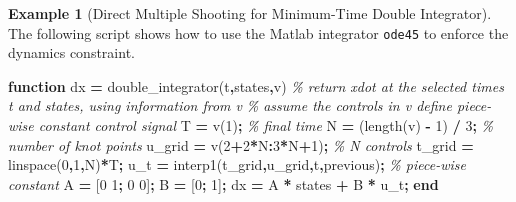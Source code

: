 \documentclass[
]{book}
\newenvironment{Shaded}{\begin{snugshade}}{\end{snugshade}}
\newcommand{\CommentTok}[1]{\textcolor[rgb]{0.56,0.35,0.01}{\textit{#1}}}
\newcommand{\FloatTok}[1]{\textcolor[rgb]{0.00,0.00,0.81}{#1}}
\newcommand{\KeywordTok}[1]{\textcolor[rgb]{0.13,0.29,0.53}{\textbf{#1}}}
\newcommand{\NormalTok}[1]{#1}
\newcommand{\OperatorTok}[1]{\textcolor[rgb]{0.81,0.36,0.00}{\textbf{#1}}}
\newcommand{\SpecialStringTok}[1]{\textcolor[rgb]{0.31,0.60,0.02}{#1}}
\newcommand{\VariableTok}[1]{\textcolor[rgb]{0.00,0.00,0.00}{#1}}
\theoremstyle{definition}
\theoremstyle{definition}
\newtheorem{example}{Example}[chapter]
\theoremstyle{definition}
\theoremstyle{definition}
\theoremstyle{remark}
\begin{document}
\begin{example}[Direct Multiple Shooting for Minimum-Time Double Integrator]
The following script shows how to use the Matlab integrator \texttt{ode45} to enforce the dynamics constraint.

\begin{Shaded}
\begin{Highlighting}[]
\KeywordTok{function} \VariableTok{dx} \OperatorTok{=} \VariableTok{double\_integrator}\NormalTok{(}\VariableTok{t}\OperatorTok{,}\VariableTok{states}\OperatorTok{,}\VariableTok{v}\NormalTok{)}
\CommentTok{\% return xdot at the selected times t and states, using information from v}
\CommentTok{\% assume the controls in v define piece{-}wise constant control signal}
\VariableTok{T} \OperatorTok{=} \VariableTok{v}\NormalTok{(}\FloatTok{1}\NormalTok{)}\OperatorTok{;} \CommentTok{\% final time}
\VariableTok{N} \OperatorTok{=}\NormalTok{ (}\VariableTok{length}\NormalTok{(}\VariableTok{v}\NormalTok{) }\OperatorTok{{-}} \FloatTok{1}\NormalTok{) }\OperatorTok{/} \FloatTok{3}\OperatorTok{;} \CommentTok{\% number of knot points}
\VariableTok{u\_grid} \OperatorTok{=} \VariableTok{v}\NormalTok{(}\FloatTok{2}\OperatorTok{+}\FloatTok{2}\OperatorTok{*}\VariableTok{N}\OperatorTok{:}\FloatTok{3}\OperatorTok{*}\VariableTok{N}\OperatorTok{+}\FloatTok{1}\NormalTok{)}\OperatorTok{;} \CommentTok{\% N controls}
\VariableTok{t\_grid} \OperatorTok{=} \VariableTok{linspace}\NormalTok{(}\FloatTok{0}\OperatorTok{,}\FloatTok{1}\OperatorTok{,}\VariableTok{N}\NormalTok{)}\OperatorTok{*}\VariableTok{T}\OperatorTok{;}
\VariableTok{u\_t} \OperatorTok{=} \VariableTok{interp1}\NormalTok{(}\VariableTok{t\_grid}\OperatorTok{,}\VariableTok{u\_grid}\OperatorTok{,}\VariableTok{t}\OperatorTok{,}\SpecialStringTok{\textquotesingle{}previous\textquotesingle{}}\NormalTok{)}\OperatorTok{;} \CommentTok{\% piece{-}wise constant}
\VariableTok{A} \OperatorTok{=}\NormalTok{ [}\FloatTok{0} \FloatTok{1}\OperatorTok{;} \FloatTok{0} \FloatTok{0}\NormalTok{]}\OperatorTok{;}
\VariableTok{B} \OperatorTok{=}\NormalTok{ [}\FloatTok{0}\OperatorTok{;} \FloatTok{1}\NormalTok{]}\OperatorTok{;}
\VariableTok{dx} \OperatorTok{=} \VariableTok{A} \OperatorTok{*} \VariableTok{states} \OperatorTok{+} \VariableTok{B} \OperatorTok{*} \VariableTok{u\_t}\OperatorTok{;}
\KeywordTok{end}


\end{Highlighting}
\end{Shaded}
\end{example}
\end{document}
